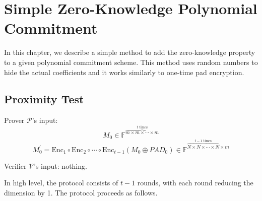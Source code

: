 \chapter{Simple Zero-Knowledge Polynomial Commitment}

In this chapter, we describe a simple method to add the zero-knowledge property to a given polynomial commitment scheme. This method uses random numbers to hide the actual coefficients and it works similarly to one-time pad encryption.

\section{Proximity Test}

Prover $\mathcal{P}$'s input: 
$$
    M_0 \in \mathbb{F}^{\overbrace{m \times m \times \cdots \times m}^{t \text{ times}}}
$$
$$
    M_0^{\prime} = \text{Enc}_1 \circ \text{Enc}_2 \circ \cdots \circ \text{Enc}_{t-1}(M_0 \oplus PAD_0) \in \mathbb{F}^{\overbrace{N \times N \times \cdots \times N}^{t-1 \text{ times}} \times m}
$$

Verifier $\mathcal{V}$'s input: nothing.

In high level, the protocol consists of $t-1$ rounds, with each round reducing the dimension by 1. The protocol proceeds as follows. 

